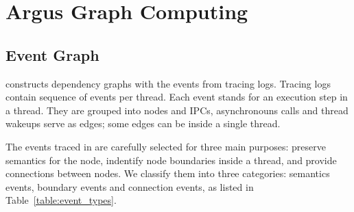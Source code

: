 \section{Argus Graph Computing}\label{sec:graphcomputing}

\subsection{Event Graph}\label{subsec:eventgraph}

\xxx constructs dependency graphs with the events from tracing logs. Tracing
logs contain sequence of events per thread. Each event stands for an execution
step in a thread. They are grouped into nodes and IPCs, asynchronouns calls and
thread wakeups serve as edges; some edges can be inside a single thread.

The events traced in \xxx are carefully selected for three main purposes:
preserve semantics for the node, indentify node boundaries inside a thread,
and provide connections between nodes. We classify them into three categories:
semantics events, boundary events and connection events, as listed in
Table~\ref{table:event_types}.

